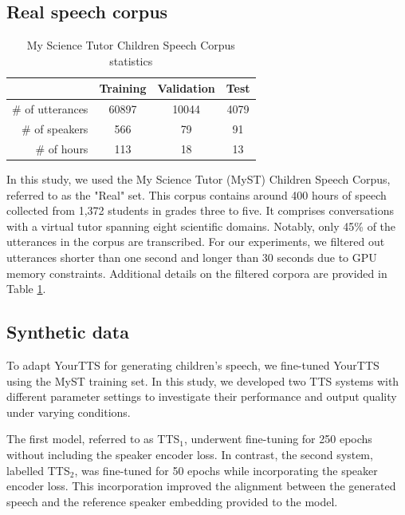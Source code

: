 \subsection{Real speech corpus}
\begin{table}[h!]
\caption{My Science Tutor Children Speech Corpus statistics}

\begin{center}
\begin{tabular}{r|c|c|c}
\hline
 & Training & Validation     & Test   \\ \hline
\# of utterances & 60897   & 10044    & 4079  \\ 
\# of speakers & 566   & 79    & 91  \\ 
\# of hours & 113   & 18    & 13  \\ \hline
\end{tabular}
\label{tab:statistics}
\end{center}
\end{table}
In this study, we used the My Science Tutor (MyST) Children Speech Corpus, referred to as the "Real" set. This corpus contains around 400 hours of speech collected from 1,372 students in grades three to five. It comprises conversations with a virtual tutor spanning eight scientific domains. 
Notably, only 45\% of the utterances in the corpus are transcribed. For our experiments, we filtered out utterances shorter than one second and longer than 30 seconds due to GPU memory constraints. Additional details on the filtered corpora are provided in Table \ref{tab:statistics}.

\subsection{Synthetic data}
To adapt YourTTS for generating children's speech, we fine-tuned YourTTS using the MyST training set. In this study, we developed two TTS systems with different parameter settings to investigate their performance and output quality under varying conditions.

The first model, referred to as TTS$_1$, underwent fine-tuning for 250 epochs without including the speaker encoder loss. In contrast, the second system, labelled TTS$_2$, was fine-tuned for 50 epochs while incorporating the speaker encoder loss. This incorporation improved the alignment between the generated speech and the reference speaker embedding provided to the model.

